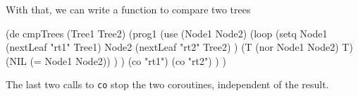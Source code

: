 With that, we can write a function to compare two trees
\begin{wideverbatim}
   (de cmpTrees (Tree1 Tree2)
      (prog1
         (use (Node1 Node2)
            (loop
               (setq
                  Node1 (nextLeaf "rt1" Tree1)
                  Node2 (nextLeaf "rt2" Tree2) )
               (T (nor Node1 Node2) T)
               (NIL (= Node1 Node2)) ) )
         (co "rt1")
         (co "rt2") ) )
\end{wideverbatim}

The last two calls to \texttt{co} stop the two coroutines, independent of the result.


